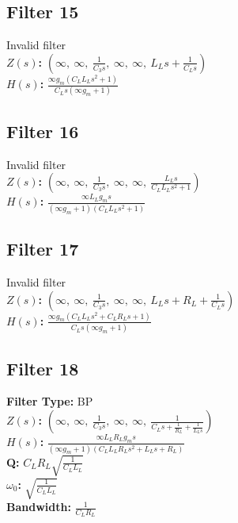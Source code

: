\documentclass{article}
\begin{document}
\subsection*{Filter 15}
Invalid filter \\ 
\textbf{$Z(s)$:} $\left( \infty, \  \infty, \  \frac{1}{C_{3} s}, \  \infty, \  \infty, \  L_{L} s + \frac{1}{C_{L} s}\right)$ \\ 
\textbf{$H(s)$:} $\frac{\infty g_{m} \left(C_{L} L_{L} s^{2} + 1\right)}{C_{L} s \left(\infty g_{m} + 1\right)}$ \\ 
\subsection*{Filter 16}
Invalid filter \\ 
\textbf{$Z(s)$:} $\left( \infty, \  \infty, \  \frac{1}{C_{3} s}, \  \infty, \  \infty, \  \frac{L_{L} s}{C_{L} L_{L} s^{2} + 1}\right)$ \\ 
\textbf{$H(s)$:} $\frac{\infty L_{L} g_{m} s}{\left(\infty g_{m} + 1\right) \left(C_{L} L_{L} s^{2} + 1\right)}$ \\ 
\subsection*{Filter 17}
Invalid filter \\ 
\textbf{$Z(s)$:} $\left( \infty, \  \infty, \  \frac{1}{C_{3} s}, \  \infty, \  \infty, \  L_{L} s + R_{L} + \frac{1}{C_{L} s}\right)$ \\ 
\textbf{$H(s)$:} $\frac{\infty g_{m} \left(C_{L} L_{L} s^{2} + C_{L} R_{L} s + 1\right)}{C_{L} s \left(\infty g_{m} + 1\right)}$ \\ 
\subsection*{Filter 18}
\textbf{Filter Type:} BP \\ 
\textbf{$Z(s)$:} $\left( \infty, \  \infty, \  \frac{1}{C_{3} s}, \  \infty, \  \infty, \  \frac{1}{C_{L} s + \frac{1}{R_{L}} + \frac{1}{L_{L} s}}\right)$ \\ 
\textbf{$H(s)$:} $\frac{\infty L_{L} R_{L} g_{m} s}{\left(\infty g_{m} + 1\right) \left(C_{L} L_{L} R_{L} s^{2} + L_{L} s + R_{L}\right)}$ \\ 
\textbf{Q:} $C_{L} R_{L} \sqrt{\frac{1}{C_{L} L_{L}}}$ \\ 
\textbf{$\omega_0$:} $\sqrt{\frac{1}{C_{L} L_{L}}}$ \\ 
\textbf{Bandwidth:} $\frac{1}{C_{L} R_{L}}$ \\ 
\end{document}
